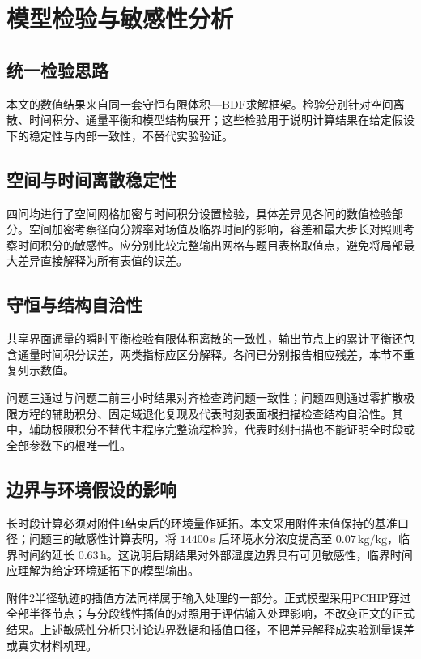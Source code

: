 \section{模型检验与敏感性分析}

\subsection{统一检验思路}

本文的数值结果来自同一套守恒有限体积—BDF求解框架。检验分别针对空间离散、时间积分、通量平衡和模型结构展开；这些检验用于说明计算结果在给定假设下的稳定性与内部一致性，不替代实验验证。

\subsection{空间与时间离散稳定性}

四问均进行了空间网格加密与时间积分设置检验，具体差异见各问的数值检验部分。空间加密考察径向分辨率对场值及临界时间的影响，容差和最大步长对照则考察时间积分的敏感性。应分别比较完整输出网格与题目表格取值点，避免将局部最大差异直接解释为所有表值的误差。

\subsection{守恒与结构自洽性}

共享界面通量的瞬时平衡检验有限体积离散的一致性，输出节点上的累计平衡还包含通量时间积分误差，两类指标应区分解释。各问已分别报告相应残差，本节不重复列示数值。

问题三通过与问题二前三小时结果对齐检查跨问题一致性；问题四则通过零扩散极限方程的辅助积分、固定域退化复现及代表时刻表面根扫描检查结构自洽性。其中，辅助极限积分不替代主程序完整流程检验，代表时刻扫描也不能证明全时段或全部参数下的根唯一性。

\subsection{边界与环境假设的影响}

长时段计算必须对附件1结束后的环境量作延拓。本文采用附件末值保持的基准口径；问题三的敏感性计算表明，将 $14400\,\mathrm{s}$ 后环境水分浓度提高至 $0.07\,\mathrm{kg/kg}$，临界时间约延长 $0.63\,\mathrm{h}$。这说明后期结果对外部湿度边界具有可见敏感性，临界时间应理解为给定环境延拓下的模型输出。

附件2半径轨迹的插值方法同样属于输入处理的一部分。正式模型采用PCHIP穿过全部半径节点；与分段线性插值的对照用于评估输入处理影响，不改变正文的正式结果。上述敏感性分析只讨论边界数据和插值口径，不把差异解释成实验测量误差或真实材料机理。
